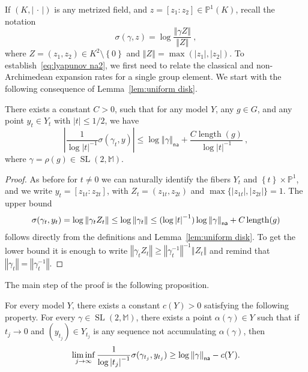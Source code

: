 \documentclass[AHL,Unicode,longabstracts]{cedram}
\DeclareMathOperator{\length}{length}
\DeclareMathOperator{\SL}{SL}
\newcommand{\mm}{\mathbb{M}}
\newcommand{\cv}{\rightarrow}
\newcommand{\set}[1]{\left\{#1\right\}}
\newcommand{\norm}[1]{\left\Vert#1\right\Vert}
\newcommand{\abs}[1]{\left\vert#1\right\vert}
\newcommand{\pu}{{\mathbb{P}^1}}
\newcommand{\PP}{\mathbb{P}}
\newcommand{\unsur}[1]{\frac{1}{#1}}
\newcommand{\na}{\mathsf{na}}
\newcommand{\inv}{^{-1}}
\begin{document}
If $(K, \abs{{\,\cdot\,}})$ is any metrized field, and $z =[z_1:z_2]\in \PP^1(K)$, recall the notation
\[
\sigma(\gamma, z) = \log \frac{\norm{\gamma Z}}{\norm{Z}}~,
\]
where $Z=(z_1, z_2)\in K^2\setminus\set{0}$ and $\norm{Z} = \max(\abs{z_1}, \abs{z_2})$. To establish~\eqref{eq:lyapunov na2}, we first need to relate the classical and non-Archimedean expansion rates for a single group element. We start with the following consequence of Lemma~\ref{lem:uniform disk}.

\begin{lemm}\label{lem:sup2}
There exists a constant $C>0$, such that for any model $Y$, any $g\in G$, and any point $y_{t}\in Y_{t}$ with $|t|\le 1/2$, we have
\begin{equation}\label{eq:sup2}
\abs{\frac{1}{\log|t|^{-1}} \sigma(\gamma_t, y)}
\leq
\log \norm{\gamma}_\na + \frac{C \length (g)}{\log\abs{t}\inv}~,
\end{equation}
where $\gamma = \rho(g) \in \SL(2,\mm)$.
\end{lemm}

\begin{proof}
As before for $t\neq 0$ we can naturally identify the fibers $Y_t$ and $\set{t}\times \pu$, and we write $y_t = [z_{1t}:z_{2t}]$, with $Z_t = (z_{1t}, z_{2t})$ and $\max\{ |z_{1t}|, |z_{2t}|\} =1$. The upper bound
\[
\sigma(\gamma_t, y_{t}) = \log\norm{\gamma_t Z_t} \leq \log\norm{\gamma_t} \le
(\log\abs{t}\inv) \log\norm{\gamma}_{\sf na} + C \length (g)
\]
follows directly from the definitions and Lemma~\ref{lem:uniform disk}. To get the lower bound it is enough to write $ \norm{\gamma_t Z_t} \geq \norm{\gamma_t\inv}\inv \norm{Z_t}$ and remind that $\norm{\gamma_t} = \norm{\gamma_t\inv}$.
\end{proof}

The main step of the proof is the following proposition.

\begin{prop}\label{prop:hybrid}
For every model $Y$, there exists a constant $c(Y)>0$ satisfying the following property. For every $\gamma \in \SL(2, \mm)$, there exists a point $\alpha(\gamma)\in Y$ such that if $t_j\cv0$ and $(y_{t_j})\in Y_{t_j}$ is any sequence not accumulating $\alpha(\gamma)$, then
\begin{equation}\label{eq:norm}
\liminf_{j\cv\infty} \unsur{\log\abs{t_j}\inv} \sigma(\gamma_{t_j}, y_{t_j}) \geq \log\norm{\gamma}_{\sf na} - c(Y).
\end{equation}
\end{prop}
\end{document}

